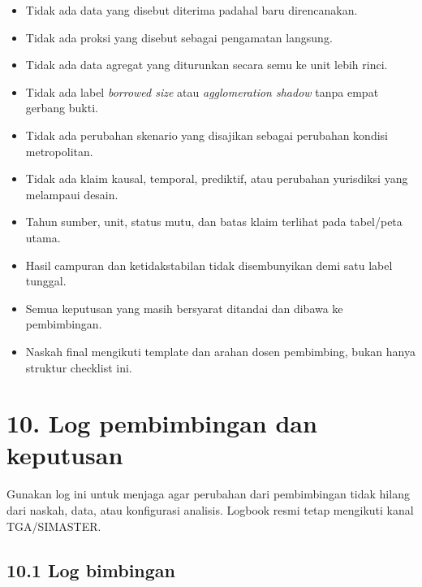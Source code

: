 \documentclass[
  indonesian,
  11pt,
]{article}
\providecommand{\tightlist}{%
  \setlength{\itemsep}{0pt}\setlength{\parskip}{0pt}}
\renewcommand{\tightlist}{%
  \setlength{\itemsep}{0.22em}%
  \setlength{\parskip}{0pt}%
}
\begin{document}
\begin{itemize}
\tightlist
\item[$\square$]
  Tidak ada data yang disebut diterima padahal baru direncanakan.
\item[$\square$]
  Tidak ada proksi yang disebut sebagai pengamatan langsung.
\item[$\square$]
  Tidak ada data agregat yang diturunkan secara semu ke unit lebih
  rinci.
\item[$\square$]
  Tidak ada label \emph{borrowed size} atau \emph{agglomeration shadow}
  tanpa empat gerbang bukti.
\item[$\square$]
  Tidak ada perubahan skenario yang disajikan sebagai perubahan kondisi
  metropolitan.
\item[$\square$]
  Tidak ada klaim kausal, temporal, prediktif, atau perubahan yurisdiksi
  yang melampaui desain.
\item[$\square$]
  Tahun sumber, unit, status mutu, dan batas klaim terlihat pada
  tabel/peta utama.
\item[$\square$]
  Hasil campuran dan ketidakstabilan tidak disembunyikan demi satu label
  tunggal.
\item[$\square$]
  Semua keputusan yang masih bersyarat ditandai dan dibawa ke
  pembimbingan.
\item[$\square$]
  Naskah final mengikuti template dan arahan dosen pembimbing, bukan
  hanya struktur checklist ini.
\end{itemize}

\section{10. Log pembimbingan dan
keputusan}\label{log-pembimbingan-dan-keputusan}

Gunakan log ini untuk menjaga agar perubahan dari pembimbingan tidak
hilang dari naskah, data, atau konfigurasi analisis. Logbook resmi tetap
mengikuti kanal TGA/SIMASTER.

\subsection{10.1 Log bimbingan}\label{log-bimbingan}
\end{document}
